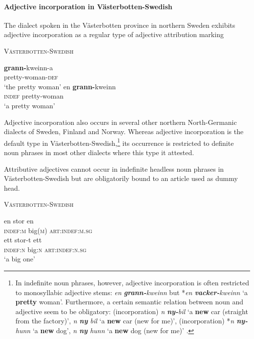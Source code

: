 \paragraph{Adjective incorporation in Västerbotten-Swedish} \label{bondska synchr}
The dialect spoken in the Västerbotten province in northern Sweden exhibits adjective incorporation as a regular type of adjective attribution marking
\begin{exe}
\ex \textsc{Västerbotten-Swedish} \citep[91–92]{holmberg-etal2003}
\begin{xlist}
\ex
\gll 	\textbf{grann-}kweinn-a\\	
	pretty-woman-\textsc{def}\\
\glt	‘the pretty woman’
\ex
\gll	en \textbf{grann-}kweinn\\
	\textsc{indef} pretty-woman\\
\glt	‘a pretty woman’
\end{xlist}
\end{exe}
Adjective incorporation also occurs in several other northern North-Germanic dialects of Sweden, Finland and Norway. Whereas adjective incorporation is the default type in Väster\-botten-Swedish,\footnote{In indefinite noun phrases, however, adjective incorporation is often restricted to monosyllabic adjective stems: \textit{en \textbf{grann-}kweinn} but *\textit{en \textbf{vacker-}kweinn} ‘a \textbf{pretty} woman’. Furthermore, a certain semantic relation between noun and adjective seem to be obligatory: (incorporation) \textit{n \textbf{ny-}bil} ‘a \textbf{new} car (straight from the factory)’, \textit{n \textbf{ny} bil} ‘a \textbf{new} car (new for me)’, (incorporation) *\textit{n \textbf{ny-}hunn} ‘a \textbf{new} dog’, \textit{n \textbf{ny} hunn} ‘a \textbf{new} dog (new for me)’ \cite[91–92]{holmberg-etal2003}.} its occurrence is restricted to definite noun phrases in most other dialects where this type it attested.

Attributive adjectives cannot occur in indefinite headless noun phrases in Västerbotten-Swedish but are obligatorily bound to an article used as dummy head.
\begin{exe}
\ex  \textsc{Västerbotten-Swedish} \citep{holmberg-etal2003,delsing1996}
\begin{xlist}
\ex
\gll 	en stor en\\	
	\textsc{indef:m} big(\textsc{m}) \textsc{art:indef:m.sg}\\
\ex
\gll 	ett stor-t ett\\	
	\textsc{indef:n} big:\textsc{n} \textsc{art:indef:n.sg}\\
\glt	‘a big one’
\end{xlist}
\end{exe}

